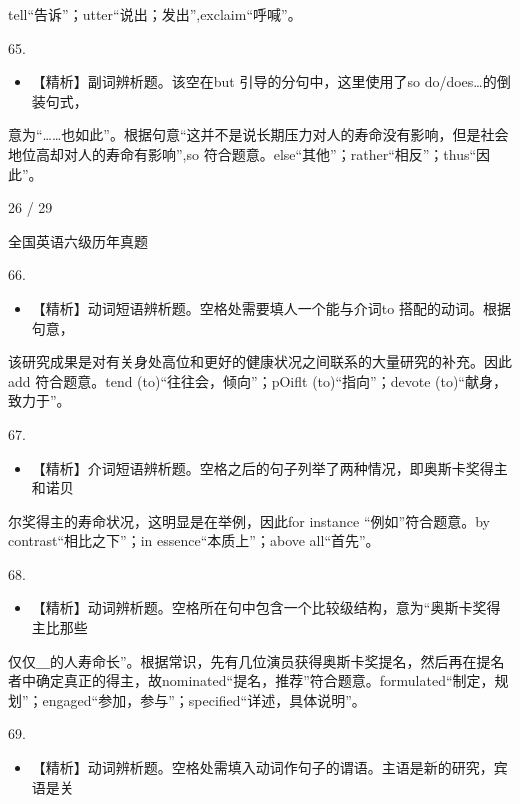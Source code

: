 \documentclass[UTF8,11pt]{ctexart}
\begin{document}
tell“告诉”；utter“说出；发出”,exclaim“呼喊”。


65.


\begin{itemize}[leftmargin=2em,itemsep=.2em,topsep=.4em]\item[C.] 【精析】副词辨析题。该空在but 引导的分句中，这里使用了so do/does…的倒装句式，
\end{itemize}

意为“……也如此”。根据句意“这并不是说长期压力对人的寿命没有影响，但是社会地位高却对人的寿命有影响”,so 符合题意。else“其他”；rather“相反”；thus“因此”。


26 / 29


全国英语六级历年真题


66.


\begin{itemize}[leftmargin=2em,itemsep=.2em,topsep=.4em]\item[D.] 【精析】动词短语辨析题。空格处需要填人一个能与介词to 搭配的动词。根据句意，
\end{itemize}

该研究成果是对有关身处高位和更好的健康状况之间联系的大量研究的补充。因此add 符合题意。tend (to)“往往会，倾向”；pOiflt (to)“指向”；devote (to)“献身，致力于”。


67.


\begin{itemize}[leftmargin=2em,itemsep=.2em,topsep=.4em]\item[A.] 【精析】介词短语辨析题。空格之后的句子列举了两种情况，即奥斯卡奖得主和诺贝
\end{itemize}

尔奖得主的寿命状况，这明显是在举例，因此for instance “例如”符合题意。by contrast“相比之下”；in essence“本质上”；above all“首先”。


68.


\begin{itemize}[leftmargin=2em,itemsep=.2em,topsep=.4em]\item[B.] 【精析】动词辨析题。空格所在句中包含一个比较级结构，意为“奥斯卡奖得主比那些
\end{itemize}

仅仅＿的人寿命长”。根据常识，先有几位演员获得奥斯卡奖提名，然后再在提名者中确定真正的得主，故nominated“提名，推荐”符合题意。formulated“制定，规划”；engaged“参加，参与”；specified“详述，具体说明”。


69.


\begin{itemize}[leftmargin=2em,itemsep=.2em,topsep=.4em]\item[D.] 【精析】动词辨析题。空格处需填入动词作句子的谓语。主语是新的研究，宾语是关
\end{itemize}
\end{document}
